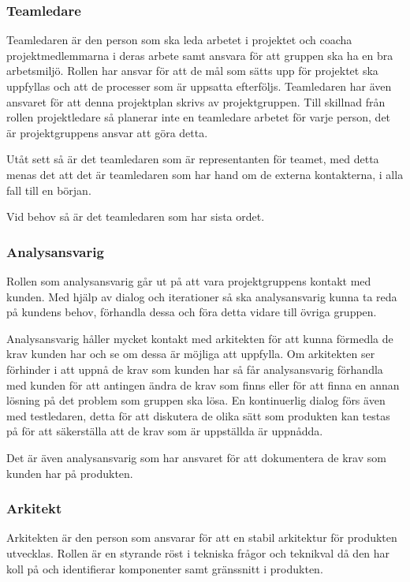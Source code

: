 \documentclass[a4paper,10pt, twoside]{article}
\begin{document}
\subsubsection{Teamledare}
Teamledaren är den person som ska leda arbetet i projektet och coacha projektmedlemmarna i deras arbete samt ansvara för att gruppen ska ha en bra arbetsmiljö. Rollen har ansvar för att de mål som sätts upp för projektet ska uppfyllas och att de processer som är uppsatta efterföljs. Teamledaren har även ansvaret för att denna projektplan skrivs av projektgruppen. Till skillnad från rollen projektledare så planerar inte en teamledare arbetet för varje person, det är projektgruppens ansvar att göra detta.

Utåt sett så är det teamledaren som är representanten för teamet, med detta menas det att det är teamledaren som har hand om de externa kontakterna, i alla fall till en början.

Vid behov så är det teamledaren som har sista ordet.
\subsubsection{Analysansvarig}
Rollen som analysansvarig går ut på att vara projektgruppens kontakt med kunden. Med hjälp av dialog och iterationer så ska analysansvarig kunna ta reda på kundens behov, förhandla dessa och föra detta vidare till övriga gruppen.

Analysansvarig håller mycket kontakt med arkitekten för att kunna förmedla de krav kunden har och se om dessa är möjliga att uppfylla. Om arkitekten ser förhinder i att uppnå de krav som kunden har så får analysansvarig förhandla med kunden för att antingen ändra de krav som finns eller för att finna en annan lösning på det problem som gruppen ska lösa.
En kontinuerlig dialog förs även med testledaren, detta för att diskutera de olika sätt som produkten kan testas på för att säkerställa att de krav som är uppställda är uppnådda.

Det är även analysansvarig som har ansvaret för att dokumentera de krav som kunden har på produkten.
\subsubsection{Arkitekt}
Arkitekten är den person som ansvarar för att en stabil arkitektur för produkten utvecklas. Rollen är en styrande röst i tekniska frågor och teknikval då den har koll på och identifierar komponenter samt gränssnitt i produkten.
\end{document}
